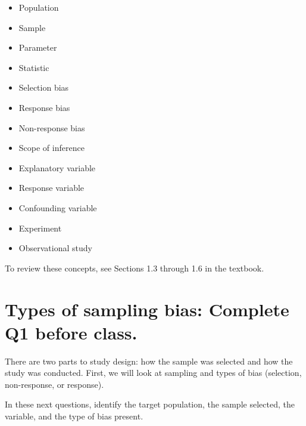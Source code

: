 \documentclass[
]{report}
\begin{document}
\begin{itemize}
\item
  Population
\item
  Sample
\item
  Parameter
\item
  Statistic
\item
  Selection bias
\item
  Response bias
\item
  Non-response bias
\item
  Scope of inference
\item
  Explanatory variable
\item
  Response variable
\item
  Confounding variable
\item
  Experiment
\item
  Observational study
\end{itemize}

To review these concepts, see Sections 1.3 through 1.6 in the textbook.

\newpage

\hypertarget{types-of-sampling-bias-complete-q1-before-class.}{%
\section{Types of sampling bias: Complete Q1 before class.}\label{types-of-sampling-bias-complete-q1-before-class.}}

There are two parts to study design: how the sample was selected and how the study was conducted. First, we will look at sampling and types of bias (selection, non-response, or response).

In these next questions, identify the target population, the sample selected, the variable, and the type of bias present.
\end{document}

